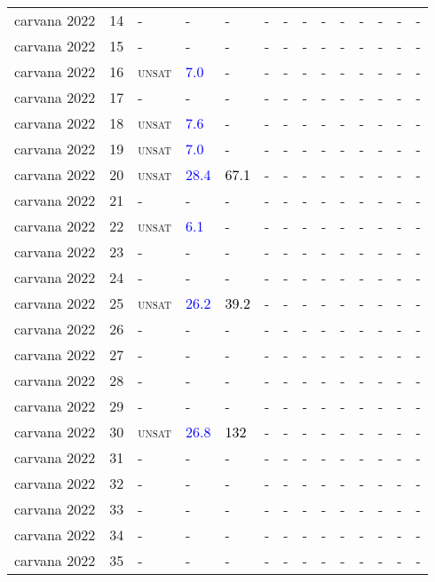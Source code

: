 \begin{center}
{\begin{longtable}{@{}llllllllllllll@{}}
carvana 2022 & 14 & - & - & - & - & - & - & - & - & - & - & - & - \\
carvana 2022 & 15 & - & - & - & - & - & - & - & - & - & - & - & - \\
carvana 2022 & 16 & \textsc{unsat} & \textcolor{blue}{7.0} & - & - & - & - & - & - & - & - & - & - \\
carvana 2022 & 17 & - & - & - & - & - & - & - & - & - & - & - & - \\
carvana 2022 & 18 & \textsc{unsat} & \textcolor{blue}{7.6} & - & - & - & - & - & - & - & - & - & - \\
carvana 2022 & 19 & \textsc{unsat} & \textcolor{blue}{7.0} & - & - & - & - & - & - & - & - & - & - \\
carvana 2022 & 20 & \textsc{unsat} & \textcolor{blue}{28.4} & \textcolor{black}{67.1} & - & - & - & - & - & - & - & - & - \\
carvana 2022 & 21 & - & - & - & - & - & - & - & - & - & - & - & - \\
carvana 2022 & 22 & \textsc{unsat} & \textcolor{blue}{6.1} & - & - & - & - & - & - & - & - & - & - \\
carvana 2022 & 23 & - & - & - & - & - & - & - & - & - & - & - & - \\
carvana 2022 & 24 & - & - & - & - & - & - & - & - & - & - & - & - \\
carvana 2022 & 25 & \textsc{unsat} & \textcolor{blue}{26.2} & \textcolor{black}{39.2} & - & - & - & - & - & - & - & - & - \\
carvana 2022 & 26 & - & - & - & - & - & - & - & - & - & - & - & - \\
carvana 2022 & 27 & - & - & - & - & - & - & - & - & - & - & - & - \\
carvana 2022 & 28 & - & - & - & - & - & - & - & - & - & - & - & - \\
carvana 2022 & 29 & - & - & - & - & - & - & - & - & - & - & - & - \\
carvana 2022 & 30 & \textsc{unsat} & \textcolor{blue}{26.8} & \textcolor{black}{132} & - & - & - & - & - & - & - & - & - \\
carvana 2022 & 31 & - & - & - & - & - & - & - & - & - & - & - & - \\
carvana 2022 & 32 & - & - & - & - & - & - & - & - & - & - & - & - \\
carvana 2022 & 33 & - & - & - & - & - & - & - & - & - & - & - & - \\
carvana 2022 & 34 & - & - & - & - & - & - & - & - & - & - & - & - \\
carvana 2022 & 35 & - & - & - & - & - & - & - & - & - & - & - & - \\

\end{longtable}}
\end{center}

